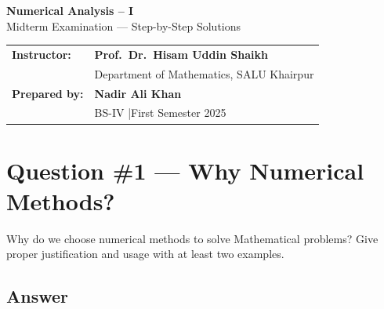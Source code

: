 \documentclass[12pt]{article}
\begin{document}
\thispagestyle{empty}

\begin{tcolorbox}[
  enhanced, arc=0pt, boxrule=0pt,
  colback=primary, colframe=primary,
  left=16pt, right=16pt, top=18pt, bottom=14pt,
  borderline south={4pt}{0pt}{accent},
]
  \centering
  {\huge\bfseries\color{white} Numerical Analysis -- I}\\[6pt]
  {\large\color{lightbg} Midterm Examination --- Step-by-Step Solutions}
\end{tcolorbox}

\vspace{4pt}

\begin{tcolorbox}[
  enhanced, arc=0pt, boxrule=0pt,
  colback=white, colframe=white,
  borderline north={1.5pt}{0pt}{accent!60},
  borderline south={1.5pt}{0pt}{accent!60},
  left=16pt, right=16pt, top=12pt, bottom=12pt,
]
  \begin{tabular}{p{3.2cm} p{9.5cm}}
    \textcolor{primary}{\textbf{Instructor:}}
      & \textbf{Prof.\ Dr.\ Hisam Uddin Shaikh} \\
      & {\small\color{darktext}Department of Mathematics, SALU Khairpur} \\[8pt]
    \textcolor{primary}{\textbf{Prepared by:}}
      & \textbf{Nadir Ali Khan} \\
      & {\small\color{darktext}BS-IV \quad|\quad First Semester 2025} \\
  \end{tabular}
\end{tcolorbox}

\vspace{14pt}

\section{Question \#1 --- Why Numerical Methods?}

\begin{problembox}
Why do we choose numerical methods to solve Mathematical problems?
Give proper justification and usage with at least two examples.
\end{problembox}

\subsection*{Answer}
\end{document}
